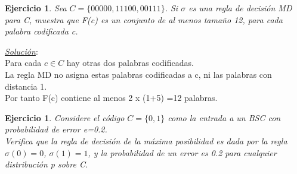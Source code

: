 \documentclass{beamer}
\theoremstyle{plain}
\theoremstyle{example}
\newtheorem{ejercicio} [Ejercicio]{Ejercicio}
\theoremstyle{example}
\begin{document}
\begin{frame}  \small 

\begin{ejercicio} 
Sea $C =\{000 00, 111 00, 001 11\}$. Si $\sigma$ es una regla de decisión MD para C, muestra que F(c) es un conjunto de al menos tamaño 12, para cada palabra codificada c.

\end{ejercicio}  \textit{\underline{Solución}}:\\ 

\vspace{0.3cm}
Para cada $c \in C$ hay otras dos palabras codificadas.\\

La regla MD no asigna estas palabras codificadas a c, ni las palabras con distancia 1. \\


Por tanto F(c) contiene al menos 2 x (1+5) =12 palabras.\\


\end{frame} 

\begin{frame}  \small \begin{ejercicio}
Considere el código $C = \{0, 1\}$ como la entrada a un BSC con probabilidad de error e=0.2. \\
\vspace{0.1cm}
Verifica que la regla de decisión de la máxima posibilidad es dada por la regla $\sigma(0) = 0$, $\sigma(1) = 1$, y la probabilidad de un error es 0.2 para cualquier distribución p sobre C.

 \end{ejercicio} 
 \end{frame}  

 
\end{document}

